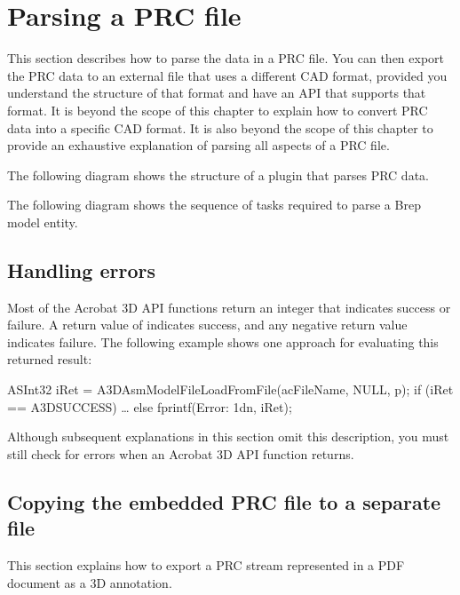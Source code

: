 \documentclass[letterpaper,12pt,english,openany,oneside]{sphinxmanual}
\begin{document}
\section{Parsing a PRC file}
\label{\detokenize{Plugins_A3D_API:parsing-a-prc-file}}
This section describes how to parse the data in a PRC file. You can then export the PRC data to an external file that uses a different CAD format, provided you understand the structure of that format and have an API that supports that format. It is beyond the scope of this chapter to explain how to convert PRC data into a specific CAD format. It is also beyond the scope of this chapter to provide an exhaustive explanation of parsing all aspects of a PRC file.

The following diagram shows the structure of a plugin that parses PRC data.

\noindent{}

The following diagram shows the sequence of tasks required to parse a Brep model entity.

\noindent{}


\subsection{Handling errors}
\label{\detokenize{Plugins_A3D_API:handling-errors}}
Most of the Acrobat 3D API functions return an integer that indicates success or failure. A return value of  indicates success, and any negative return value indicates failure. The following example shows one approach for evaluating this returned result:

\begin{sphinxVerbatim}[commandchars=\\\{\}]
ASInt32 iRet = A3DAsmModelFileLoadFromFile(acFileName, NULL, \PYGZam{}p);
if (iRet == A3D\PYGZus{}SUCCESS) \PYGZob{}
  …
\PYGZcb{} else
  fprintf(\PYGZdq{}Error: \PYGZpc{}1dn\PYGZdq{}, iRet);
\end{sphinxVerbatim}

Although subsequent explanations in this section omit this description, you must still check for errors when an Acrobat 3D API function returns.


\subsection{Copying the embedded PRC file to a separate file}
\label{\detokenize{Plugins_A3D_API:copying-the-embedded-prc-file-to-a-separate-file}}
This section explains how to export a PRC stream represented in a PDF document as a 3D annotation.
\end{document}
